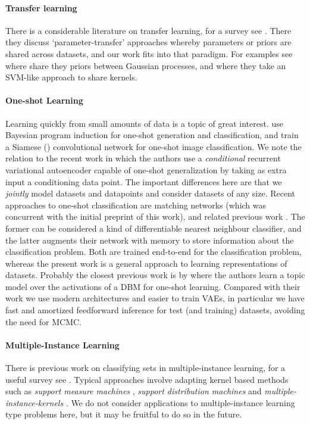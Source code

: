 \documentclass{article} \usepackage{iclr2017_conference,times}
\begin{document}
\paragraph{Transfer learning} There is a considerable literature on transfer learning, for a survey see \citet{transfer_survey}. There they discuss `parameter-transfer' approaches whereby parameters or priors are shared across datasets, and our work fits into that paradigm. For examples see \citet{informative_vector_machine} where share they priors between Gaussian processes, and \citet{multitask_svm} where they take an SVM-like approach to share kernels.

\paragraph{One-shot Learning} Learning quickly from small amounts of data is a topic of great interest. \citet{omniglot} use Bayesian program induction for one-shot generation and classification, and \cite{siamese_one_shot} train a Siamese (\cite{siamese_if_you_please}) convolutional network for one-shot image classification. We note the relation to the recent work \citep{one_shot_generative} in which the authors use a \emph{conditional} recurrent variational autoencoder capable of one-shot generalization by taking as extra input a conditioning data point. The important differences here are that we \emph{jointly} model datasets and datapoints and consider datasets of any size. Recent approaches to one-shot classification are matching networks \citep{matching} (which was concurrent with the initial preprint of this work), and related previous work \citep{mann}. The former can be considered a kind of differentiable nearest neighbour classifier, and the latter augments their network with memory to store information about the classification problem. Both are trained end-to-end for the classification problem, whereas the present work is a general approach to learning representations of datasets. Probably the closest previous work is by \cite{one_shot_boltzmann} where the authors learn a topic model over the activations of a DBM for one-shot learning. Compared with their work we use modern architectures and easier to train VAEs, in particular we have fast and amortized feedforward inference for test (and training) datasets, avoiding the need for MCMC.

\paragraph{Multiple-Instance Learning}
There is previous work on classifying sets in multiple-instance learning, for a useful survey see \citet{classification_with_sets}. Typical approaches involve adapting kernel based methods such as \emph{support measure machines} \citep{support_measure_machines}, \emph{support distribution machines} \citep{support_distribution_machines} and \emph{multiple-instance-kernels} \citep{multiple_instance_kernels}. We do not consider applications to multiple-instance learning type problems here, but it may be fruitful to do so in the future.
\end{document}
